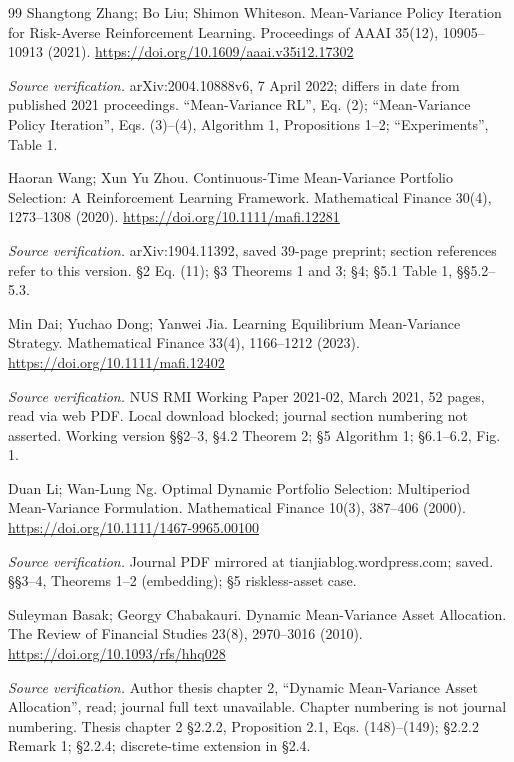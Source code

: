 \documentclass[11pt,a4paper]{article}
\theoremstyle{plain}
\theoremstyle{definition}
\theoremstyle{remark}
\begin{document}
\begin{thebibliography}{99}
 Shangtong Zhang; Bo Liu; Shimon Whiteson. Mean-Variance Policy Iteration for Risk-Averse Reinforcement Learning. Proceedings of AAAI 35(12), 10905--10913 (2021). \url{https://doi.org/10.1609/aaai.v35i12.17302}
\par\smallskip\noindent\emph{Source verification.} arXiv:2004.10888v6, 7 April 2022; differs in date from published 2021 proceedings. ``Mean-Variance RL'', Eq. (2); ``Mean-Variance Policy Iteration'', Eqs. (3)--(4), Algorithm 1, Propositions 1--2; ``Experiments'', Table 1.

 Haoran Wang; Xun Yu Zhou. Continuous-Time Mean-Variance Portfolio Selection: A Reinforcement Learning Framework. Mathematical Finance 30(4), 1273--1308 (2020). \url{https://doi.org/10.1111/mafi.12281}
\par\smallskip\noindent\emph{Source verification.} arXiv:1904.11392, saved 39-page preprint; section references refer to this version. \S{}2 Eq. (11); \S{}3 Theorems 1 and 3; \S{}4; \S{}5.1 Table 1, \S{}\S{}5.2--5.3.

 Min Dai; Yuchao Dong; Yanwei Jia. Learning Equilibrium Mean-Variance Strategy. Mathematical Finance 33(4), 1166--1212 (2023). \url{https://doi.org/10.1111/mafi.12402}
\par\smallskip\noindent\emph{Source verification.} NUS RMI Working Paper 2021-02, March 2021, 52 pages, read via web PDF. Local download blocked; journal section numbering not asserted. Working version \S{}\S{}2--3, \S{}4.2 Theorem 2; \S{}5 Algorithm 1; \S{}6.1--6.2, Fig. 1.

 Duan Li; Wan-Lung Ng. Optimal Dynamic Portfolio Selection: Multiperiod Mean-Variance Formulation. Mathematical Finance 10(3), 387--406 (2000). \url{https://doi.org/10.1111/1467-9965.00100}
\par\smallskip\noindent\emph{Source verification.} Journal PDF mirrored at tianjiablog.wordpress.com; saved. \S{}\S{}3--4, Theorems 1--2 (embedding); \S{}5 riskless-asset case.

 Suleyman Basak; Georgy Chabakauri. Dynamic Mean-Variance Asset Allocation. The Review of Financial Studies 23(8), 2970--3016 (2010). \url{https://doi.org/10.1093/rfs/hhq028}
\par\smallskip\noindent\emph{Source verification.} Author thesis chapter 2, ``Dynamic Mean-Variance Asset Allocation'', read; journal full text unavailable. Chapter numbering is not journal numbering. Thesis chapter 2 \S{}2.2.2, Proposition 2.1, Eqs. (148)--(149); \S{}2.2.2 Remark 1; \S{}2.2.4; discrete-time extension in \S{}2.4.


\end{thebibliography}
\end{document}
